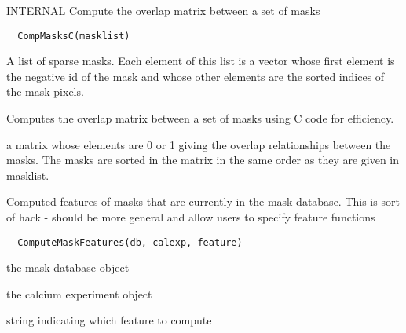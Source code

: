 \documentclass[a4paper]{book}
\begin{document}
%
\begin{Description}\relax
INTERNAL Compute the overlap matrix between a set of
masks
\end{Description}
%
\begin{Usage}
\begin{verbatim}
  CompMasksC(masklist)
\end{verbatim}
\end{Usage}
%
\begin{Arguments}
\begin{ldescription}
\item[\code{masklist}] A list of sparse masks.  Each element of
this list is a vector whose first element is the negative
id of the mask and whose other elements are the sorted
indices of the mask pixels.
\end{ldescription}
\end{Arguments}
%
\begin{Details}\relax
Computes the overlap matrix between a set of masks using
C code for efficiency.
\end{Details}
%
\begin{Value}
a matrix whose elements are 0 or 1 giving the overlap
relationships between the masks.  The masks are sorted in
the matrix in the same order as they are given in
masklist.
\end{Value}
%
\begin{Description}\relax
Computed features of masks that are currently in the mask
database. This is sort of hack - should be more general
and allow users to specify feature functions
\end{Description}
%
\begin{Usage}
\begin{verbatim}
  ComputeMaskFeatures(db, calexp, feature)
\end{verbatim}
\end{Usage}
%
\begin{Arguments}
\begin{ldescription}
\item[\code{db}] the mask database object

\item[\code{calexp}] the calcium experiment object

\item[\code{feature}] string indicating which feature to
compute
\end{ldescription}
\end{Arguments}
\end{document}
